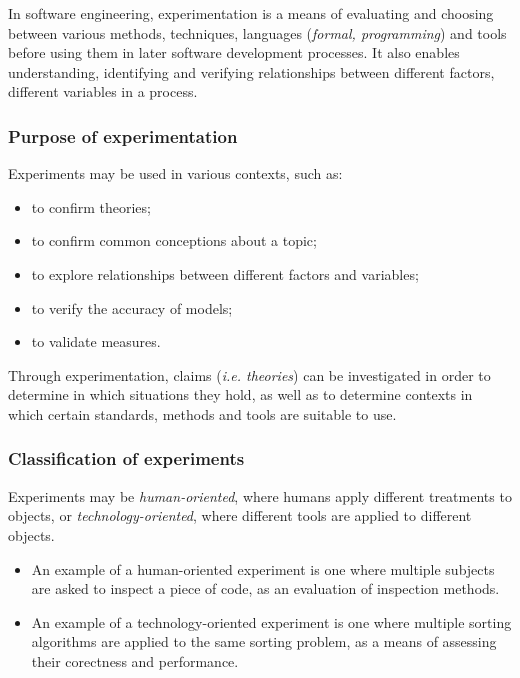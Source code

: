 \documentclass[a4paper]{article}
\begin{document}
            In software engineering, experimentation is a means of evaluating and choosing between various methods, techniques, languages (\emph{formal, programming}) and tools before using them in later software development processes. It also enables understanding, identifying and verifying relationships between different factors, different variables in a process\supercite{wohlin2012experimentation}. 
            
            \subsubsection{Purpose of experimentation}

                Experiments may be used in various contexts, such as\supercite{wohlin2012experimentation}:
                \begin{itemize}
                    \item to confirm theories;
                    \item to confirm common conceptions about a topic;
                    \item to explore relationships between different factors and variables;
                    \item to verify the accuracy of models;
                    \item to validate measures.
                \end{itemize}

                \noindent Through experimentation, claims (\emph{i.e. theories}) can be investigated in order to determine in which situations they hold, as well as to determine contexts in which certain standards, methods and tools are suitable to use.

            \subsubsection{Classification of experiments}

            \noindent Experiments may be \emph{human-oriented}, where humans apply different treatments to objects, or \emph{technology-oriented}, where different tools are applied to different objects\supercite{wohlin2012experimentation}.

            \begin{itemize}
                \item An example of a human-oriented experiment is one where multiple subjects are asked to inspect a piece of code, as an evaluation of inspection methods.
    
                \item An example of a technology-oriented experiment is one where multiple sorting algorithms are applied to the same sorting problem, as a means of assessing their corectness and performance.
            \end{itemize}
\end{document}

